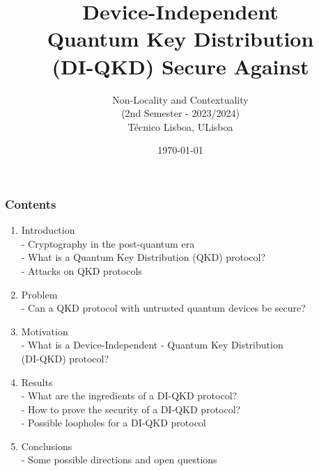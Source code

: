 \documentclass{beamer}
\title{{Device-Independent}\\{Quantum Key Distribution}\\{(DI-QKD) Secure Against}\\\vspace{0.25ex}{Collective Attacks}}
\subtitle{Non-Locality and Contextuality\\ (2nd Semester - 2023/2024)\\\vspace{-0.75ex} T\'{e}cnico Lisboa, ULisboa}
\author[R.\,A.\,Barreiro]
{%
    \texorpdfstring{
        \begin{columns}
            \column{\linewidth}
            \centering
            {R\'{u}ben Andr\'{e} Barreiro}\\
            \href{mailto:ruben.andre.letra.barreiro@tecnico.ulisboa.pt}{\color{blue}\footnotesize ruben.andre.letra.barreiro@tecnico.ulisboa.pt}
        \end{columns}
    }
    {R\'{u}ben Andr\'{e} Barreiro}
}
\date{\today}
\begin{document}
	\setcounter{showProgressBar}{0}
	\setcounter{showSlideNumbers}{0}

	\frame{\titlepage}

	\begin{frame}
		\frametitle{Contents}
        
        \vspace{4.5ex}
		\begin{enumerate}
            \item Introduction \\ \textcolor{ExecusharesGrey}{\footnotesize\hspace{1em} - Cryptography in the post-quantum era\\\hspace{1em} - What is a Quantum Key Distribution (QKD) protocol?\\\vspace{-0.75ex}\hspace{1em} - Attacks on QKD protocols}
			\item Problem \\ \textcolor{ExecusharesGrey}{\footnotesize\hspace{1em} - Can a QKD protocol with untrusted quantum devices be secure?}
			\item Motivation \\ \textcolor{ExecusharesGrey}{\footnotesize\hspace{1em} - What is a Device-Independent - Quantum Key Distribution\\\hspace{1.5em} (DI-QKD) protocol?}
			\item Results \\ \textcolor{ExecusharesGrey}{\footnotesize\hspace{1em} - What are the ingredients of a DI-QKD protocol?\\\hspace{1em} - How to prove the security of a DI-QKD protocol?\\\vspace{-0.75ex}\hspace{1em} - Possible loopholes for a DI-QKD protocol}
			\item Conclusions \\ \textcolor{ExecusharesGrey}{\footnotesize\hspace{1em} - Some possible directions and open questions}
		\end{enumerate}
	\end{frame}

	\setcounter{framenumber}{0}
	\setcounter{showProgressBar}{1}
	\setcounter{showSlideNumbers}{1}
    
\end{document}
